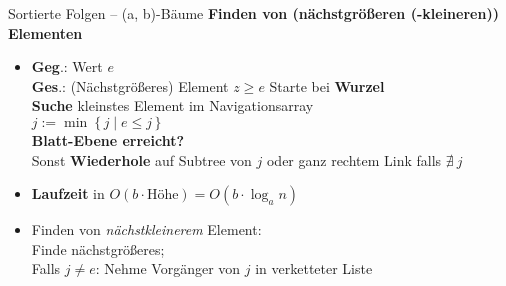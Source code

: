 

\begin{frame}{Sortierte Folgen -- (a, b)-Bäume}
	\textbf{Finden von (nächstgrößeren {\small (-kleineren)}) Elementen}
	\begin{itemize}
		\item \textbf{Geg}.: Wert $e$ \\
		\textbf{Ges}.: (Nächstgrößeres) Element $z \geq e$
		\pause
		\implitem
			Starte bei \textbf{Wurzel} \\
			\pause
			\textbf{Suche} kleinstes Element im Navigationsarray \\
			\quad $j := \min\ \{\, j \mid e \leq j\,\}$ \\
			\pause 
			\textbf{Blatt-Ebene erreicht?} \impl {} \\
			Sonst \textbf{Wiederhole} auf Subtree von $j$ oder ganz rechtem Link falls $\nexists\ j$ 
		\item \textbf{Laufzeit} in $O(b \cdot \text{Höhe}) = O(b \cdot \log_a n)$
		\pause
		\vspace{\baselineskip}
		\item Finden von \textit{nächstkleinerem} Element: \\ 
		\pause
		\quad Finde nächstgrößeres; \\
		\quad Falls $j \neq e$: Nehme Vorgänger von $j$ in verketteter Liste
	\end{itemize}
\end{frame}

